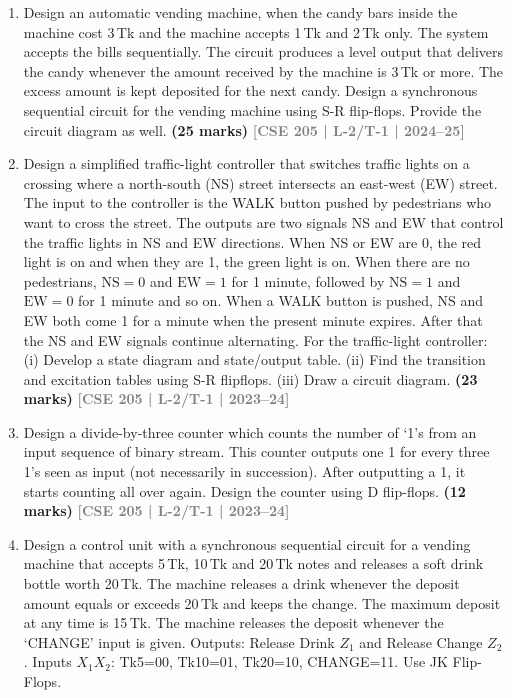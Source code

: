 \documentclass[12pt]{article}
\newcommand{\yr}[1]{\hfill\textcolor{gray}{\small\textbf{[#1]}}}
\newcommand{\mk}[1]{\textcolor{orange!70!black}{\small\textbf{(#1 marks)}}}
\begin{document}
\begin{enumerate}

\item Design an automatic vending machine, when the candy bars inside the machine cost 3\,Tk and the machine accepts 1\,Tk and 2\,Tk only. The system accepts the bills sequentially. The circuit produces a level output that delivers the candy whenever the amount received by the machine is 3\,Tk or more. The excess amount is kept deposited for the next candy. Design a synchronous sequential circuit for the vending machine using S-R flip-flops. Provide the circuit diagram as well.
\mk{25} \yr{CSE 205 | L-2/T-1 | 2024--25}

\item Design a simplified traffic-light controller that switches traffic lights on a crossing where a north-south (NS) street intersects an east-west (EW) street. The input to the controller is the WALK button pushed by pedestrians who want to cross the street. The outputs are two signals NS and EW that control the traffic lights in NS and EW directions. When NS or EW are 0, the red light is on and when they are 1, the green light is on. When there are no pedestrians, $\text{NS}=0$ and $\text{EW}=1$ for 1 minute, followed by $\text{NS}=1$ and $\text{EW}=0$ for 1 minute and so on. When a WALK button is pushed, NS and EW both come 1 for a minute when the present minute expires. After that the NS and EW signals continue alternating. For the traffic-light controller:
	(i) Develop a state diagram and state/output table.
	(ii) Find the transition and excitation tables using S-R flipflops.
	(iii) Draw a circuit diagram.
\mk{23} \yr{CSE 205 | L-2/T-1 | 2023--24}

\item Design a divide-by-three counter which counts the number of `1's from an input sequence of binary stream. This counter outputs one 1 for every three 1's seen as input (not necessarily in succession). After outputting a 1, it starts counting all over again. Design the counter using D flip-flops.
\mk{12} \yr{CSE 205 | L-2/T-1 | 2023--24}

\item Design a control unit with a synchronous sequential circuit for a vending machine that accepts 5\,Tk, 10\,Tk and 20\,Tk notes and releases a soft drink bottle worth 20\,Tk. The machine releases a drink whenever the deposit amount equals or exceeds 20\,Tk and keeps the change. The maximum deposit at any time is 15\,Tk. The machine releases the deposit whenever the `CHANGE' input is given. Outputs: Release Drink $Z_1$ and Release Change $Z_2$. Inputs $X_1X_2$: Tk5=00, Tk10=01, Tk20=10, CHANGE=11. Use JK Flip-Flops.



\end{enumerate}
\end{document}
